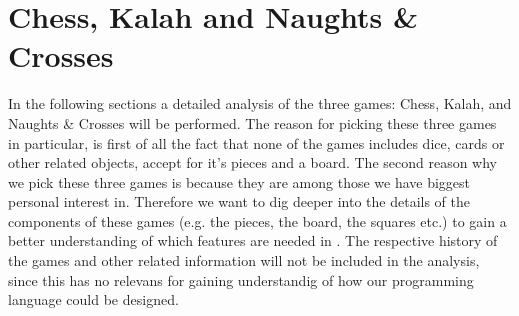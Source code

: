 \section{Chess, Kalah and Naughts \& Crosses}

In the following sections a detailed analysis of the three games: Chess, Kalah, and Naughts \& Crosses will be performed. The reason for picking these three games in particular, is first of all the fact that none of the games includes dice, cards or other related objects, accept for it's pieces and a board. The second reason why we pick these three games is because they are among those we have biggest personal interest in. Therefore we want to dig deeper into the details of the components of these games (e.g. the pieces, the board, the squares etc.) to gain a better understanding of which features are needed in \productname. The respective history of the games and other related information will not be included in the analysis, since this has no relevans for gaining understandig of how our programming language could be designed.  




%       
